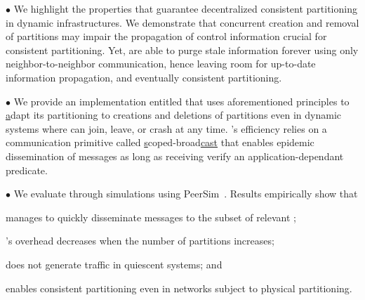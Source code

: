 \begin{asparadesc} %
\item [$\bullet$] We highlight the properties that guarantee
  decentralized consistent partitioning in dynamic infrastructures. We
  demonstrate that concurrent creation and removal of partitions may
  impair the propagation of control information crucial for consistent
  partitioning. Yet, \processes are able to purge stale information
  forever using only neighbor-to-neighbor communication, hence leaving
  room for up-to-date information propagation, and eventually
  consistent partitioning.
  
\item [$\bullet$] We provide an implementation entitled \NAME that
  uses aforementioned principles to \underline{a}dapt its partitioning
  to creations and deletions of partitions even in dynamic systems
  where \nodes can join, leave, or crash at any time. \NAME's
  efficiency relies on a communication primitive called
  \underline{s}coped-broad\underline{cast}
   that enables epidemic
  dissemination of messages as long as receiving \processes verify an
  application-dependant predicate.
 
\item [$\bullet$] We evaluate \NAME through simulations using
  PeerSim~\cite{montresor2009peersim}. Results empirically show that
  \begin{inparaenum}[(i)]
  \item \NAME manages to quickly disseminate messages to the subset of
    relevant \processes;
  \item \NAME's overhead decreases when the number of partitions
    increases;
  \item \NAME does not generate traffic in quiescent systems; and
  \item \NAME enables consistent partitioning even in networks subject
    to physical partitioning.
  \end{inparaenum}
\end{asparadesc}


